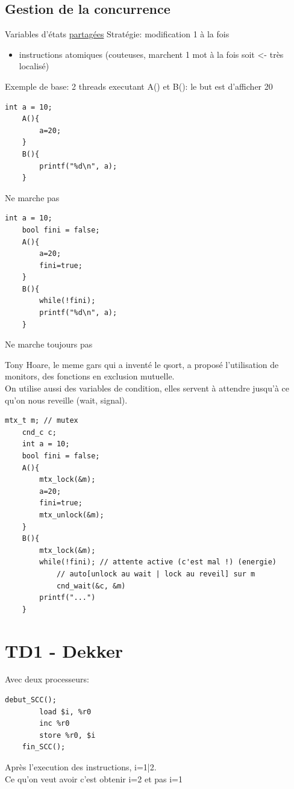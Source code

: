 \documentclass[11pt]{article}
\begin{document}
\subsection{Gestion de la concurrence}
Variables d'états \underline{partagées}
Stratégie: modification 1 à la fois
\begin{itemize}
	\item instructions atomiques (couteuses, marchent 1 mot à la fois soit <- très localisé)\\
\end{itemize}

Exemple de base: 2 threads executant A() et B(): le but est d'afficher 20
\begin{lstlisting}[frame=single]
	int a = 10;
	A(){
		a=20;
	}
	B(){
		printf("%d\n", a);
	}
\end{lstlisting}
Ne marche pas

\begin{lstlisting}[frame=single]
	int a = 10;
	bool fini = false;
	A(){
		a=20;
		fini=true;
	}
	B(){
		while(!fini);
		printf("%d\n", a);
	}
\end{lstlisting}
Ne marche toujours pas

\pagebreak


Tony Hoare, le meme gars qui a inventé le qsort, a proposé l'utilisation de monitors, des fonctions en exclusion mutuelle. \\
On utilise aussi des variables de condition, elles servent à attendre jusqu'à ce qu'on nous reveille (wait, signal).

\begin{lstlisting}[frame=single]
	mtx_t m; // mutex
	cnd_c c;
	int a = 10;
	bool fini = false;
	A(){
		mtx_lock(&m);
		a=20;
		fini=true;
		mtx_unlock(&m);
	}
	B(){
		mtx_lock(&m);
		while(!fini); // attente active (c'est mal !) (energie)
			// auto[unlock au wait | lock au reveil] sur m
			cnd_wait(&c, &m) 
		printf("...")
	}
\end{lstlisting}

\pagebreak

\section{TD1 - Dekker}
Avec deux processeurs:
\begin{lstlisting}[frame=single]
	debut_SCC();
		load $i, %r0
		inc %r0
		store %r0, $i
	fin_SCC();
\end{lstlisting}
Après l'execution des instructions, i=1|2.\\
Ce qu'on veut avoir c'est obtenir i=2 et pas i=1
\end{document}
